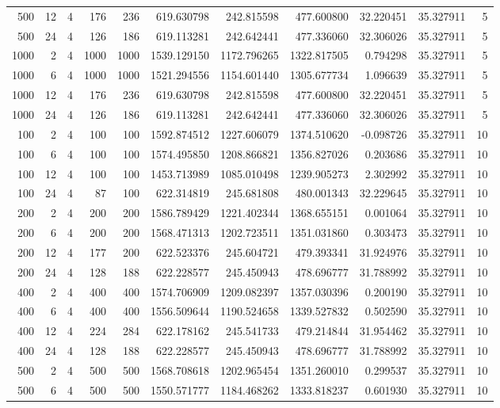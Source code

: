 \begin{table}
\begin{tabular}{rrrrrrrrrrr}
500 & 12 & 4 & 176 & 236 & 619.630798 & 242.815598 & 477.600800 & 32.220451 & 35.327911 & 5 \\
500 & 24 & 4 & 126 & 186 & 619.113281 & 242.642441 & 477.336060 & 32.306026 & 35.327911 & 5 \\
1000 & 2 & 4 & 1000 & 1000 & 1539.129150 & 1172.796265 & 1322.817505 & 0.794298 & 35.327911 & 5 \\
1000 & 6 & 4 & 1000 & 1000 & 1521.294556 & 1154.601440 & 1305.677734 & 1.096639 & 35.327911 & 5 \\
1000 & 12 & 4 & 176 & 236 & 619.630798 & 242.815598 & 477.600800 & 32.220451 & 35.327911 & 5 \\
1000 & 24 & 4 & 126 & 186 & 619.113281 & 242.642441 & 477.336060 & 32.306026 & 35.327911 & 5 \\
100 & 2 & 4 & 100 & 100 & 1592.874512 & 1227.606079 & 1374.510620 & -0.098726 & 35.327911 & 10 \\
100 & 6 & 4 & 100 & 100 & 1574.495850 & 1208.866821 & 1356.827026 & 0.203686 & 35.327911 & 10 \\
100 & 12 & 4 & 100 & 100 & 1453.713989 & 1085.010498 & 1239.905273 & 2.302992 & 35.327911 & 10 \\
100 & 24 & 4 & 87 & 100 & 622.314819 & 245.681808 & 480.001343 & 32.229645 & 35.327911 & 10 \\
200 & 2 & 4 & 200 & 200 & 1586.789429 & 1221.402344 & 1368.655151 & 0.001064 & 35.327911 & 10 \\
200 & 6 & 4 & 200 & 200 & 1568.471313 & 1202.723511 & 1351.031860 & 0.303473 & 35.327911 & 10 \\
200 & 12 & 4 & 177 & 200 & 622.523376 & 245.604721 & 479.393341 & 31.924976 & 35.327911 & 10 \\
200 & 24 & 4 & 128 & 188 & 622.228577 & 245.450943 & 478.696777 & 31.788992 & 35.327911 & 10 \\
400 & 2 & 4 & 400 & 400 & 1574.706909 & 1209.082397 & 1357.030396 & 0.200190 & 35.327911 & 10 \\
400 & 6 & 4 & 400 & 400 & 1556.509644 & 1190.524658 & 1339.527832 & 0.502590 & 35.327911 & 10 \\
400 & 12 & 4 & 224 & 284 & 622.178162 & 245.541733 & 479.214844 & 31.954462 & 35.327911 & 10 \\
400 & 24 & 4 & 128 & 188 & 622.228577 & 245.450943 & 478.696777 & 31.788992 & 35.327911 & 10 \\
500 & 2 & 4 & 500 & 500 & 1568.708618 & 1202.965454 & 1351.260010 & 0.299537 & 35.327911 & 10 \\
500 & 6 & 4 & 500 & 500 & 1550.571777 & 1184.468262 & 1333.818237 & 0.601930 & 35.327911 & 10 \\

\end{tabular}
\end{table}
